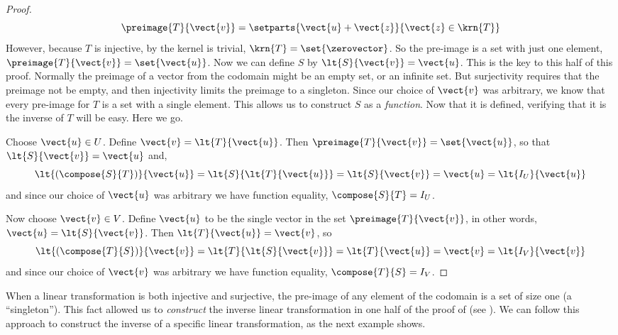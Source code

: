 \begin{proof}
%
\begin{equation*}
\preimage{T}{\vect{v}}=\setparts{\vect{u}+\vect{z}}{\vect{z}\in\krn{T}}
\end{equation*}
%
However, because $T$ is injective, by  the kernel is trivial, $\krn{T}=\set{\zerovector}$.  So the pre-image is a set with just one element, $\preimage{T}{\vect{v}}=\set{\vect{u}}$.  Now we can define $S$ by $\lt{S}{\vect{v}}=\vect{u}$.  This is the key to this half of this proof.  Normally the preimage of a vector from the codomain might be an empty set, or an infinite set.  But surjectivity requires that the preimage not be empty, and then injectivity limits the preimage to a singleton.  Since our choice of $\vect{v}$ was arbitrary, we know that every pre-image for $T$ is a set with a single element.  This allows us to construct $S$ as a {\em function}.  Now that it is defined, verifying that it is the inverse of $T$ will be easy.  Here we go.\par
%
Choose $\vect{u}\in U$.  Define $\vect{v}=\lt{T}{\vect{u}}$.  Then $\preimage{T}{\vect{v}}=\set{\vect{u}}$, so that $\lt{S}{\vect{v}}=\vect{u}$ and,
%
\begin{equation*}
\lt{\left(\compose{S}{T}\right)}{\vect{u}}
=\lt{S}{\lt{T}{\vect{u}}}
=\lt{S}{\vect{v}}
=\vect{u}
=\lt{I_U}{\vect{u}}
\end{equation*}
%
and since our choice of $\vect{u}$ was arbitrary we have function equality, $\compose{S}{T}=I_U$.\par
%
Now choose $\vect{v}\in V$.  Define $\vect{u}$ to be the single vector in the set $\preimage{T}{\vect{v}}$, in other words, $\vect{u}=\lt{S}{\vect{v}}$.  Then $\lt{T}{\vect{u}}=\vect{v}$, so
%
\begin{equation*}
\lt{\left(\compose{T}{S}\right)}{\vect{v}}
=\lt{T}{\lt{S}{\vect{v}}}
=\lt{T}{\vect{u}}
=\vect{v}
=\lt{I_V}{\vect{v}}
\end{equation*}
%
%
and since our choice of $\vect{v}$ was arbitrary we have function equality, $\compose{T}{S}=I_V$.\par
%
\end{proof}
%
When a linear transformation is both injective and surjective, the pre-image of any element of the codomain is a set of size one (a ``singleton'').  This fact allowed us to {\em construct} the inverse linear transformation in one half of the proof of  (see ).  We can follow this approach to construct the inverse of a specific linear transformation, as the next example shows.

